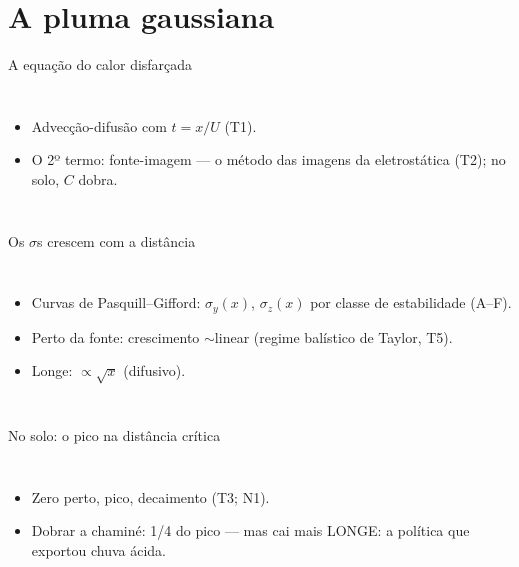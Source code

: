 \documentclass[aspectratio=169,11pt]{beamer}
\begin{document}
\section{A pluma gaussiana}

\begin{frame}{A equação do calor disfarçada}
  \begin{columns}
    \vspace{0.4em}
    \begin{itemize}
      \item Advecção-difusão com $t = x/U$ (T1).
      \item O 2º termo: \alert{fonte-imagem} — o método das imagens
            da eletrostática (T2); no solo, $C$ dobra.
    \end{itemize}
  \end{columns}
\end{frame}

\begin{frame}{Os $\sigma$s crescem com a distância}
  \begin{columns}
    \begin{itemize}
      \item Curvas de Pasquill--Gifford: $\sigma_y(x)$, $\sigma_z(x)$
            por classe de estabilidade (A--F).
      \item Perto da fonte: crescimento $\sim$linear (regime
            balístico de Taylor, T5).
      \item Longe: $\propto\sqrt{x}$ (difusivo).
    \end{itemize}
  \end{columns}
\end{frame}

\begin{frame}{No solo: o pico na distância crítica}
  \begin{columns}
    \vspace{0.4em}
    \begin{itemize}
      \item Zero perto, pico, decaimento (T3; N1).
      \item Dobrar a chaminé: 1/4 do pico — mas cai mais LONGE: a
            política que exportou chuva ácida.
    \end{itemize}
  \end{columns}
\end{frame}
\end{document}
